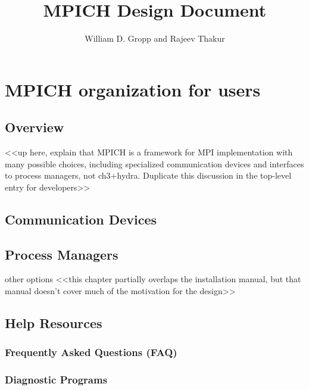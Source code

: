 \documentclass{report}
\begin{document}

\title{MPICH Design Document}
\author{William D. Gropp and Rajeev Thakur}
\maketitle

\tableofcontents
\clearpage



\pagestyle{headings}

\part{MPICH organization for users}

\chapter{Overview}
     <<up here, explain that MPICH is a framework for MPI implementation with many possible choices, including specialized communication devices and interfaces to process managers, not ch3+hydra.  Duplicate this discussion in the top-level entry for developers>>

\chapter{Communication Devices}

\chapter{Process Managers}

    other options 
    <<this chapter partially overlaps the installation manual, but that manual doesn't cover much of the motivation for the design>>

\chapter{Help Resources}

\section{Frequently Asked Questions (FAQ)}

\section{Diagnostic Programs}
\end{document}
